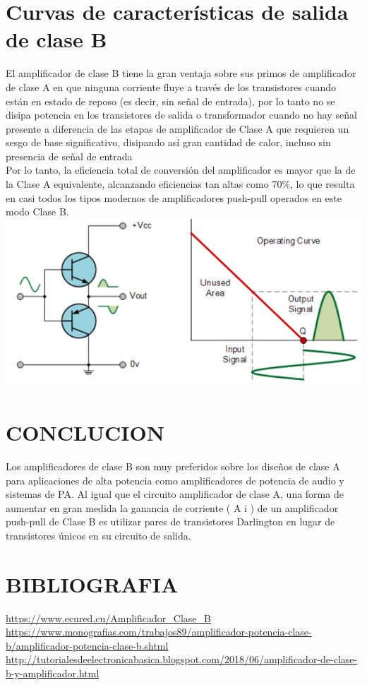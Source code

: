 \documentclass[12pt,a4paper]{article}
\begin{document}
\section{Curvas de caracter\'isticas de salida de clase B
}
El amplificador de clase B tiene la gran ventaja sobre sus primos de amplificador de clase A en que ninguna corriente fluye a trav\'es de los transistores cuando están en estado de reposo (es decir, sin se\~nal de entrada), por lo tanto no se disipa potencia en los transistores de salida o transformador cuando no hay se\~nal presente a diferencia de las etapas de amplificador de Clase A que requieren un sesgo de base significativo, disipando as\'i gran cantidad de calor, incluso sin presencia de se\~nal de entrada\\Por lo tanto, la eficiencia total de conversi\'on del amplificador es mayor que la de la Clase A equivalente, alcanzando eficiencias tan altas como 70\%, lo que resulta en casi todos los tipos modernos de amplificadores push-pull operados en este modo Clase B.\\
\includegraphics[width=15cm]{Amplificador de clase B.jpg} 
\\
\section{CONCLUCION}
Los amplificadores de clase B son muy preferidos sobre los dise\~nos de clase A para aplicaciones de alta potencia como amplificadores de potencia de audio y sistemas de PA. Al igual que el circuito amplificador de clase A, una forma de aumentar en gran medida la ganancia de corriente ( A i ) de un amplificador push-pull de Clase B es utilizar pares de transistores Darlington en lugar de transistores \'unicos en su circuito de salida.
  

\section{BIBLIOGRAFIA}
\url{https://www.ecured.cu/Amplificador_Clase_B}\\
\url{https://www.monografias.com/trabajos89/amplificador-potencia-clase-b/amplificador-potencia-clase-b.shtml}\\
\url{http://tutorialesdeelectronicabasica.blogspot.com/2018/06/amplificador-de-clase-b-y-amplificador.html}
\end{document}
